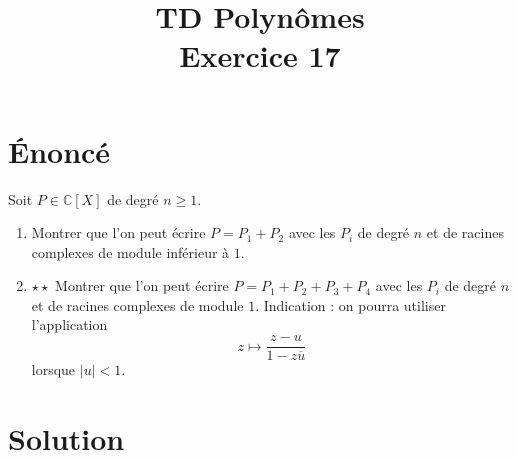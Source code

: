 \documentclass[french]{article}
\title{TD Polynômes \\ Exercice 17}
\date{}
\newcommand{\C}{\mathbb{C}}
\begin{document}
\maketitle

\section{Énoncé}
Soit $P\in\C[X]$ de degré $n\geqslant 1$.
\begin{enumerate}
	\item Montrer que l'on peut écrire $P=P_1+P_2$ avec les $P_i$ de degré $n$ et de racines complexes de module inférieur à $1$.
	\item $\star\star$ Montrer que l'on peut écrire $P=P_1+P_2+P_3+P_4$ avec les $P_i$ de degré $n$ et de racines complexes de module $1$. Indication : on pourra utiliser l'application $$z\mapsto\frac{z-u}{1-z\overline{u}}$$ lorsque $\lvert u\rvert <1$.
\end{enumerate}
\section{Solution}
\end{document}
